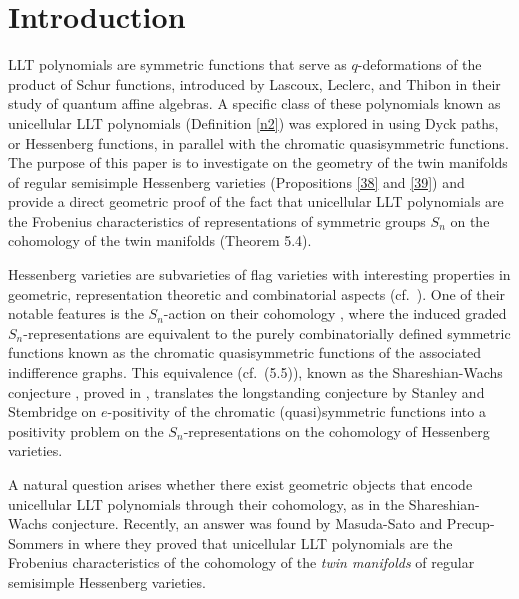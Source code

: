 \documentclass[11pt]{article}
\theoremstyle{definition}
\numberwithin{equation}{section}
\numberwithin{equation}{section}
\begin{document}
\section{Introduction}
LLT polynomials are symmetric functions that serve as $q$-deformations of the product of Schur functions, introduced by Lascoux, Leclerc, and Thibon \cite{LLT} in their study of quantum affine algebras.
A specific class of these polynomials known as unicellular LLT polynomials (Definition \ref{n2}) was explored in \cite{CM} using Dyck paths, or Hessenberg functions, in parallel with the chromatic quasisymmetric functions. 
The purpose of this paper is to investigate on the geometry of the twin manifolds of regular semisimple Hessenberg varieties (Propositions \ref{38} and \ref{39}) and provide a direct geometric proof of the fact that  
unicellular LLT polynomials are the Frobenius characteristics of representations of symmetric groups $S_n$ on the cohomology of the twin manifolds (Theorem 5.4). 

Hessenberg varieties are subvarieties of flag varieties with interesting properties in geometric, representation theoretic and combinatorial aspects (cf.~\cite{DMPS, AH}). 
One of their notable features is the $S_n$-action on their cohomology \cite{Tym}, where the induced graded $S_n$-representations are equivalent to the purely combinatorially defined symmetric functions known as the chromatic quasisymmetric functions \cite{Sta, SW} of the associated indifference graphs. 
This equivalence (cf.~(5.5)), known as the Shareshian-Wachs conjecture \cite{SW}, proved in \cite{BC, GP2}, translates the longstanding conjecture by Stanley and Stembridge \cite{SS} on $e$-positivity of the chromatic (quasi)symmetric functions into a positivity problem on the $S_n$-representations on the cohomology of Hessenberg varieties.


A natural question arises whether there exist geometric objects that encode unicellular LLT polynomials through their cohomology, as in the Shareshian-Wachs conjecture. 
Recently, an answer was found by Masuda-Sato and Precup-Sommers in \cite{MS,PS} 
where they proved
that unicellular LLT polynomials are the Frobenius characteristics of the cohomology of the \emph{twin manifolds} of regular semisimple Hessenberg varieties. 
\end{document}
